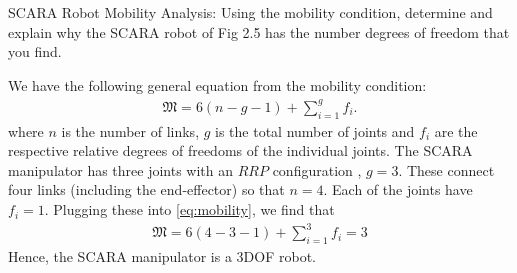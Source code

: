 \noindent 
\begin{homework}{SCARA Robot Mobility Analysis:}
	\newline 
Using the mobility condition, determine and explain why the SCARA robot of Fig 2.5 has the number degrees of freedom that you find.
\end{homework}

\begin{solution}
	We have the following general equation from the mobility condition:
	\begin{align}
	\mathfrak{M} = 6(n - g - 1) + \sum_{i=1}^{g} f_i.
	\label{eq:mobility}
	\end{align}
	where $n$ is the number of links, $g$ is the total number of joints and $f_i$  are the respective relative degrees of freedoms of the individual joints. The SCARA manipulator has three joints with an $RRP$ configuration \ie, $g=3$. These connect four links (including the end-effector) so that $n = 4$. Each of the joints have $f_i=1$. Plugging these into \eqref{eq:mobility}, we find that
	\begin{align}
	\mathfrak{M} = 6(4-3-1) + \sum_{i=1}^3 f_i = 3
	\end{align}
	Hence, the SCARA manipulator is a 3DOF robot.
\end{solution}

